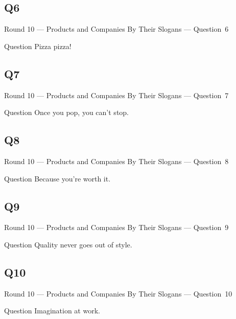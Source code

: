 \documentclass[11pt]{beamer}
\begin{document}
\subsection*{Q6}
\begin{frame}[t]{Round 10 --- Products and Companies By Their Slogans --- \mbox{Question 6}}
\begin{block}{Question}
Pizza pizza!
\end{block}
\end{frame}
\subsection*{Q7}
\begin{frame}[t]{Round 10 --- Products and Companies By Their Slogans --- \mbox{Question 7}}
\begin{block}{Question}
Once you pop, you can't stop.
\end{block}
\end{frame}
\subsection*{Q8}
\begin{frame}[t]{Round 10 --- Products and Companies By Their Slogans --- \mbox{Question 8}}
\begin{block}{Question}
Because you're worth it.
\end{block}
\end{frame}
\subsection*{Q9}
\begin{frame}[t]{Round 10 --- Products and Companies By Their Slogans --- \mbox{Question 9}}
\begin{block}{Question}
Quality never goes out of style.
\end{block}
\end{frame}
\subsection*{Q10}
\begin{frame}[t]{Round 10 --- Products and Companies By Their Slogans --- \mbox{Question 10}}
\begin{block}{Question}
Imagination at work.
\end{block}
\end{frame}
\end{document}
